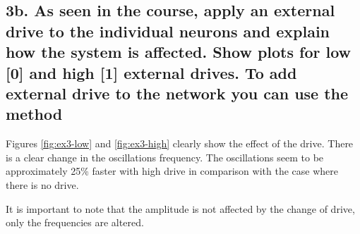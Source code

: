 \documentclass{cmc}
\begin{document}
\subsection*{3b. As seen in the course, apply an external drive to the
  individual neurons and explain how the system is affected. Show
  plots for low [0] and high [1] external drives. To add external
  drive to the network you can use the method \\
   }
\label{sec:4c}
Figures \ref{fig:ex3-low} and \ref{fig:ex3-high} clearly show the effect of the drive. There is a clear change in the oscillations frequency. The oscillations seem to be approximately 25\% faster with high drive in comparison with the case where there is no drive. 

It is important to note that the amplitude is not affected by the change of drive, only the frequencies are altered. 
\end{document}
